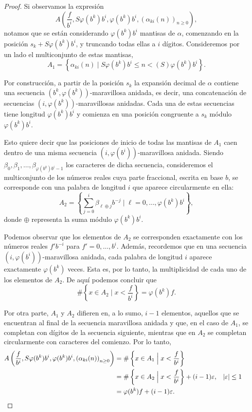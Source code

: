 \begin{proof}
Si observamos la expresión
\[ A\left(\frac{f}{b^i}, S \varphi(b^k) b^i, \varphi(b^k) b^i,
	\left(\alpha_{ki}(n)\right)_{n\geq0} \right), \]
notamos
que se están considerando $\varphi(b^k)b^i$ mantisas de $\alpha$, comenzando
en la posición $s_k + S\varphi(b^k)b^i$, y truncando todas ellas a $i$ dígitos.
Consideremos por un lado el multiconjunto de estas mantisas,
\[ A_1 = \left\lbrace \alpha_{ki}(n) \;\Big\vert\; S \varphi(b^k) b^i \leq n
	< (S) \varphi(b^k) b^i \right\rbrace. \]

Por construcción, a partir de la posición $s_k$ la expansión decimal de
$\alpha$ contiene una secuencia $(b^k, \varphi(b^k))$-maravillosa anidada,
es decir, una concatenación de secuencias
$(i, \varphi(b^k))$-maravillosas anidadas. Cada una de estas secuencias tiene
longitud $\varphi(b^k)b^{i}$ y comienza en una posición congruente a $s_k$
módulo $\varphi(b^k)b^{i}$.

Esto quiere decir que las posiciones de inicio de todas las mantisas de $A_1$
caen dentro de una misma secuencia $(i, \varphi(b^i))$-maravillosa anidada.
Siendo $\beta_0, \beta_1, \dots, \beta_{\varphi(b^k)b^{i}-1}$ los caracteres
de dicha secuencia, consideremos el multiconjunto de los números reales cuya
parte fraccional, escrita en base $b$, se corresponde con una palabra de
longitud $i$ que aparece circularmente en ella:
\[ A_2 = \left\lbrace \sum_{j=0}^{i} \beta_{\ell \oplus j} b^{-j}
	\;\Bigg\vert\; \ell = 0, \dots, \varphi(b^k)b^i \right\rbrace, \]
donde $\oplus$ representa la suma módulo $\varphi(b^k)b^{i}$.

Podemos observar que los elementos de $A_2$ se corresponden exactamente con
los números reales $f'b^{-i}$ para $f' = 0, \dots, b^i$.
Además, recordemos que en una secuencia $(i, \varphi(b^i))$-maravillosa anidada,
cada palabra de longitud $i$ aparece exactamente $\varphi(b^k)$ veces.
Esta es, por lo tanto, la multiplicidad de cada uno de los elementos de $A_2$.
De aquí podemos concluir que
\[ \# \left\lbrace x \in A_2
	\;\Big\vert\; x < \frac{f}{b^i} \right\rbrace = \varphi(b^k)f. \]

Por otra parte, $A_1$ y $A_2$ difieren en, a lo sumo, $i - 1$ elementos,
aquellos que se encuentran al final de la secuencia maravillosa anidada y
que, en el caso de $A_1$, se completan con dígitos de la secuencia siguiente,
mientras que en $A_2$ se completan circularmente con caracteres del comienzo.
Por lo tanto,
\begin{align*}
	A\left(\frac{f}{b^i}, S \varphi(b^k) b^i, \varphi(b^k) b^i,
		\left(\alpha_{ki}(n)\right)_{n\geq0} \right)
	&= \# \left\lbrace x \in A_1 \;\Big\vert\;
		x < \frac{f}{b^i} \right\rbrace \\
	&= \# \left\lbrace x \in A_2 \;\Big\vert\;
		x < \frac{f}{b^i} \right\rbrace + (i - 1)\varepsilon,
		& \vert\varepsilon\vert &\leq 1 \\
	&= \varphi(b^k)f + (i - 1)\varepsilon. && \qedhere
\end{align*}

\end{proof}

